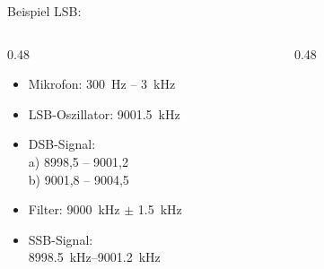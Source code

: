 \begin{frame}
    \begin{exampleblock}{Beispiel LSB:}
        \begin{columns}[T]
            \begin{column}{0.48\textwidth}
                \begin{itemize}
                    \item Mikrofon: \qty{300}{\hertz} -- \qty{3}{\kilo\hertz}
                    \item LSB-Oszillator: \qty{9001,5}{\kilo\hertz}
                    \item DSB-Signal:\\ a) 8998,5 -- 9001,2\\ b) 9001,8 -- 9004,5
                    \item Filter: \qty{9000}{\kilo\hertz}  $\pm$  \qty{1,5}{\kilo\hertz}
                    \item SSB-Signal:\\\qtyrange{8998,5}{9001,2}{\kilo\hertz}
                \end{itemize}
            \end{column}
            \begin{column}{0.48\textwidth}
                \begin{figure}
                \end{figure}
            \end{column}
        \end{columns}
    \end{exampleblock}
\end{frame}

